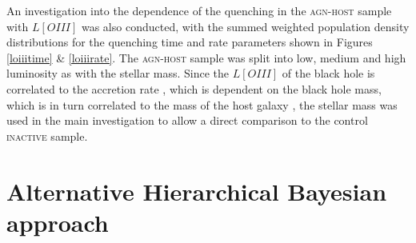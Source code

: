 \documentclass[useAMS,usenatbib]{mn2e}
\def\secondchange    {\color{srv} }
\begin{document}
An investigation into the dependence of the quenching in the \textsc{agn-host} sample with $L[OIII]$ was also conducted, with the summed weighted {\secondchange population density} distributions for the quenching time and rate parameters shown in Figures \ref{loiiitime} \& \ref{loiiirate}. The \textsc{agn-host} sample was split into low, medium and high luminosity as with the stellar mass. Since the  $L[OIII]$ of the black hole is correlated to the accretion rate \citep{Kauff03b}, which is dependent on the black hole mass, which is in turn correlated to the mass of the host galaxy \citep{Mag98}, the stellar mass was used in the main investigation to allow a direct comparison to the control \textsc{inactive} sample. 


\section{Alternative Hierarchical Bayesian approach}\label{althyper}
\end{document}
